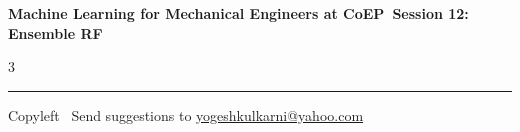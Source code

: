 \documentclass[8pt,landscape]{article}
\begin{document}
\footnotesize

\begin{center}
\Large{\textbf{Machine Learning for Mechanical Engineers at CoEP\ Session 12: Ensemble RF}}
\end{center}

\begin{multicols}{3}

\end{multicols}

\rule{\linewidth}{0.25pt}
\scriptsize
Copyleft \textcopyleft\  Send suggestions to
\href{http://www.yogeshkulkarni.com}{yogeshkulkarni@yahoo.com}
\end{document}
